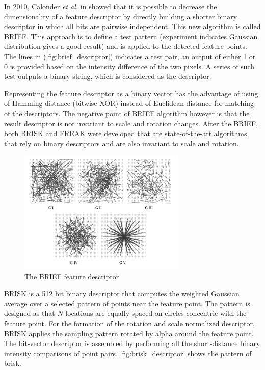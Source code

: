 In 2010, Calonder \textit{et al.} in \cite{calonder2010brief} showed that it is possible to decrease the dimensionality of a feature descriptor by directly building a shorter binary descriptor in which all bits are pairwise independent. This new algorithm is called BRIEF. This approach is to define a test pattern (experiment indicates Gaussian distribution gives a good result) and is applied to the detected feature points. The lines in (\autoref{fig:brief_descriptor}) indicates a test pair, an output of either 1 or 0 is provided based on the intensity difference of the two pixels. A series of such test outputs a binary string, which is considered as the descriptor. 

Representing the feature descriptor as a binary vector has the advantage of using of Hamming distance (bitwise XOR) instead of Euclidean distance for matching of the descriptors. The negative point of BRIEF algorithm however is that the result descriptor is not invariant to scale and rotation changes. After the BRIEF, both BRISK \cite{leutenegger2011brisk} and FREAK \cite{alahi2012freak} were developed that are state-of-the-art algorithms that rely on binary descriptors and are also invariant to scale and rotation. 

\begin{figure}[H]
  \centering
  \includegraphics[width=80mm]{figures/brief_descriptor}
  \caption{The BRIEF feature descriptor}\label{fig:brief_descriptor}
\end{figure}

BRISK is a 512 bit binary descriptor that computes the weighted Gaussian average over a selected pattern of points near the feature point. The pattern is designed as that $N$ locations are equally spaced on circles concentric with the feature point. For the formation of the rotation and scale normalized descriptor, BRISK applies the sampling pattern rotated by alpha around the feature point. The bit-vector descriptor is assembled by performing all the short-distance binary intensity comparisons of point pairs. \autoref{fig:brisk_descriptor} shows the pattern of brisk.

